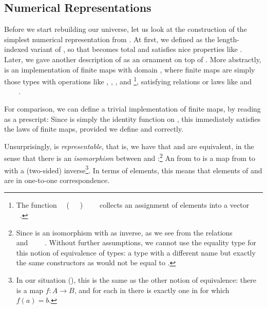 \subsection{Numerical Representations}\label{sec:desc-numrep}
Before we start rebuilding our universe, let us look at the construction of the simplest numerical representation  from \bN{}. At first, we defined  as the length-indexed variant of , so that  becomes total and satisfies nice properties like . Later, we gave another description of  as an ornament on top of . More abstractly,  is an implementation of finite maps with domain , where finite maps are simply those types with operations like , , , and \footnote{The function \ \AV{:}\ (\ \ \ )\ \ \ \  collects an assignment of elements  into a vector \ .}, satisfying relations or laws like  and \ \ \ \ .

For comparison, we can define a trivial implementation of finite maps, by reading  as a prescript:
Since  is simply the identity function on , this immediately satisfies the laws of finite maps, provided we define  and  correctly.

Unsurprisingly,  is \emph{representable}, that is, we have that  and  are equivalent, in the sense that there is an \emph{isomorphism} between  and :\footnote{Since  is an isomorphism with  as inverse, as we see from the relations \ \ \ \  and  \ \ \ \ . Without further assumptions, we cannot use the equality type  for this notion of equivalence of types: a type with a different name but exactly the same constructors as  would not be equal to .}
An  from  to  is a map from  to  with a (two-sided) inverse\footnote{In our situation (), this is the same as the other notion of equivalence: there is a map $f : A \to B$, and for each  in  there is exactly one  in  for which $f(a) = b$.}. In terms of elements, this means that elements of  and  are in one-to-one correspondence.

